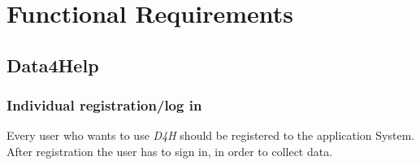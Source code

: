 \section{Functional Requirements}
    \subsection{Data4Help}
        \subsubsection{Individual registration/log in}
            Every user who wants to use \emph{D4H} should be registered to the application System. After registration the user has to sign in, in order to collect data.\\

            \begin{table}[H]
            
            	\centering
                

\end{table}
